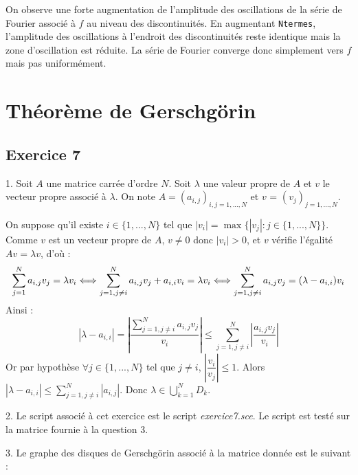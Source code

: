 \documentclass[a4paper,11pt]{article}
\begin{document}
	On observe une forte augmentation de l'amplitude des oscillations de la série de Fourier associé à $f$ au niveau des discontinuités. En augmentant {\tt Ntermes}, l'amplitude des oscillations à l'endroit des discontinuités reste identique mais la zone d'oscillation est réduite. La série de Fourier converge donc simplement vers $f$ mais pas uniformément.


\section{Théorème de Gerschgörin}

\subsection*{Exercice 7}

	1. Soit $A$ une matrice carrée d'ordre $N$. Soit $\lambda$ une valeur propre de $A$ et $v$ le vecteur propre associé à $\lambda$. On note $A = (a_{i,j})_{i,j=1,...,N}$ et $v$ = $(v_{j})_{j=1,...,N}$.

	On suppose qu'il existe $i \in \{1, ..., N\}$ tel que $|v_{i}| = \max \{ |v_{j}| : j \in \{1, ..., N\}\}$. Comme $v$ est un vecteur propre de $A$, $v \neq 0$ donc $|v_{i}| > 0$, et $v$ vérifie l'égalité $Av = \lambda v$, d'où :
	\begin{equation*}
		\sum_{j = 1}^{N} a_{i, j} v_{j} = \lambda v_{i}
		\Longleftrightarrow \sum_{j = 1, j \neq i}^{N} a_{i, j} v_{j} + a_{i, i} v_{i}= \lambda v_{i} \\
		\Longleftrightarrow \sum_{j = 1, j \neq i}^{N} a_{i, j} v_{j} = (\lambda - a_{i, i}) v_{i}
	\end{equation*}
	Ainsi :
	\begin{equation*}
		|\lambda - a_{i, i}| = \left|\frac{\sum\limits_{j = 1, j \neq i}^{N} a_{i, j} v_{j}}{v_{i}} \right|
		\leqslant \sum_{j = 1, j \neq i}^{N} \left|\frac{a_{i, j} v_{j}}{v_{i}} \right|
	\end{equation*}
	Or par hypothèse $\forall j \in \{1, ..., N\}$ tel que $j \neq i$, $\left|\dfrac{v_{i}}{v_{j}}\right| \leqslant 1$.
	Alors $|\lambda - a_{i, i}| \leqslant \sum\limits_{j = 1, j \neq i}^{N} |a_{i, j}|$. \newline
	Donc $\lambda \in \bigcup\limits_{k=1}^{N} D_{k}$.
	
	2. Le script associé à cet exercice est le script \textit{exercice7.sce}. Le script est testé sur la matrice fournie à la question 3.
	
	3. Le graphe des disques de Gerschgörin associé à la matrice donnée est le suivant :
	
\end{document}
